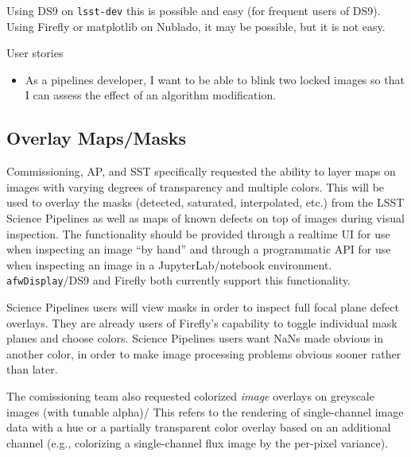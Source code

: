 Using DS9 on \texttt{lsst-dev} this is possible and easy (for frequent users of DS9).
Using Firefly or matplotlib on Nublado, it may be possible, but it is not easy.

User stories
\begin{itemize}
\item{As a pipelines developer,  I want to be able to blink two locked images so that I can assess the effect of an algorithm modification.}
\end{itemize}


\subsection{Overlay Maps/Masks}
\label{sec:features:masks}

Commissioning, AP, and SST specifically requested the ability to layer maps on
images with varying degrees of transparency and multiple colors.
This will be used to overlay the masks (detected, saturated, interpolated, etc.)
from the LSST Science Pipelines as well as maps of known defects on top of
images during visual inspection.  The functionality should be provided through
a realtime UI for use when inspecting an image ``by hand'' and through a
programmatic API for use when inspecting an image in a JupyterLab/notebook
environment.  \texttt{afwDisplay}/DS9 and Firefly both currently support this
functionality.

Science Pipelines users will view masks in order to inspect full focal plane defect overlays.
They are already users of Firefly's capability to toggle individual mask planes and choose colors.
Science Pipelines users want NaNs made obvious in another color, in order to make image processing problems obvious sooner rather than later. 

The comissioning team also requested colorized \emph{image} overlays on greyscale images (with tunable alpha)/
This refers to the rendering of single-channel image data with a hue or a partially transparent color overlay based on an additional channel (e.g., colorizing a single-channel flux image by the per-pixel variance).




